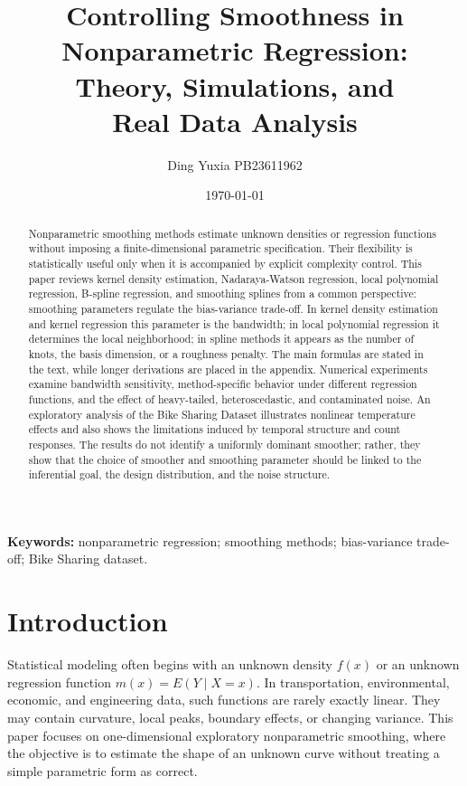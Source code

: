 \documentclass[12pt,a4paper]{article}
\title{\vspace{-1.1cm}\textbf{\huge Controlling Smoothness in Nonparametric Regression: \\Theory, Simulations, and \\Real Data Analysis}}
\author{Ding Yuxia \quad PB23611962}
\date{\today}
\begin{document}
\renewcommand{\baselinestretch}{1.18}\normalsize
\setlength{\parindent}{0pt}
\setlength{\parskip}{0.28em}
\maketitle

\begin{abstract}
Nonparametric smoothing methods estimate unknown densities or regression functions without imposing a finite-dimensional parametric specification. Their flexibility is statistically useful only when it is accompanied by explicit complexity control. This paper reviews kernel density estimation, Nadaraya-Watson regression, local polynomial regression, B-spline regression, and smoothing splines from a common perspective: smoothing parameters regulate the bias-variance trade-off. In kernel density estimation and kernel regression this parameter is the bandwidth; in local polynomial regression it determines the local neighborhood; in spline methods it appears as the number of knots, the basis dimension, or a roughness penalty. The main formulas are stated in the text, while longer derivations are placed in the appendix. Numerical experiments examine bandwidth sensitivity, method-specific behavior under different regression functions, and the effect of heavy-tailed, heteroscedastic, and contaminated noise. An exploratory analysis of the Bike Sharing Dataset illustrates nonlinear temperature effects and also shows the limitations induced by temporal structure and count responses. The results do not identify a uniformly dominant smoother; rather, they show that the choice of smoother and smoothing parameter should be linked to the inferential goal, the design distribution, and the noise structure.
\end{abstract}

\noindent\textbf{Keywords:} nonparametric regression; smoothing methods; bias-variance trade-off; Bike Sharing dataset.

\setcounter{tocdepth}{2}
\tableofcontents

\section{Introduction}

Statistical modeling often begins with an unknown density \(f(x)\) or an unknown regression function \(m(x)=E(Y\mid X=x)\). In transportation, environmental, economic, and engineering data, such functions are rarely exactly linear. They may contain curvature, local peaks, boundary effects, or changing variance. This paper focuses on one-dimensional exploratory nonparametric smoothing, where the objective is to estimate the shape of an unknown curve without treating a simple parametric form as correct.
\end{document}
